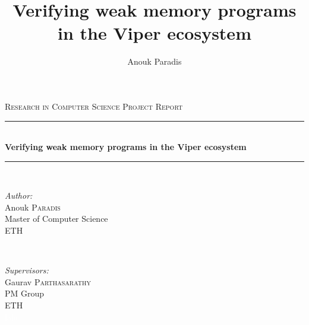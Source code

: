 \documentclass[titlepage,11pt,a4paper]{report}
\title{Verifying weak memory programs in the Viper ecosystem}
\author{Anouk Paradis}
\theoremstyle{plain}
\begin{document}
\begin{titlepage}

\newcommand{\HRule}{\rule{\linewidth}{0.5mm}} %

\center %
 

\textsc{\Large Research in Computer Science Project Report}\\[0.5cm] %


\HRule \\[0.4cm]
{ \huge \bfseries Verifying weak memory programs in the Viper ecosystem}\\[0.4cm] %
\HRule \\[1.5cm]


 

\begin{minipage}{0.4\textwidth}
\begin{flushleft} \large
\emph{Author:}\\
Anouk \textsc{Paradis} \\%
\small
Master of Computer Science\\
ETH
\end{flushleft}
\end{minipage}
~
\begin{minipage}{0.4\textwidth}
\begin{flushright} \large
\emph{Supervisors:} \\
Gaurav \textsc{Parthasarathy}\\ %
\small
PM Group\\
ETH\\
\textcolor{white}{lala}\\


\end{flushright}
\end{minipage}
\end{titlepage}
\end{document}
